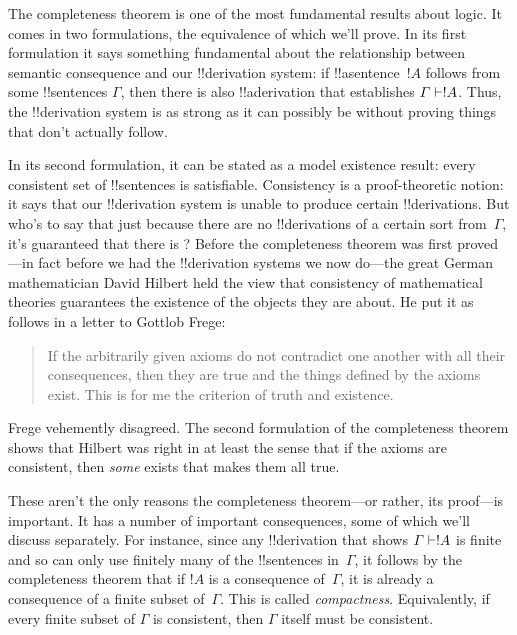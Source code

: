 \documentclass[../../../include/open-logic-section]{subfiles}
\begin{document}
      {}
      {}


The completeness theorem is one of the most fundamental results about
logic.  It comes in two formulations, the equivalence of which we'll
prove.  In its first formulation it says something fundamental about
the relationship between semantic consequence and our !!{derivation}
system: if !!a{sentence}~$!A$ follows from some !!{sentence}s
$\Gamma$, then there is also !!a{derivation} that establishes $\Gamma
\Proves !A$. Thus, the !!{derivation} system is as strong as it can
possibly be without proving things that don't actually follow.

In its second formulation, it can be stated as a model existence
result: every consistent set of !!{sentence}s is satisfiable.
Consistency is a proof-theoretic notion: it says that our
!!{derivation} system is unable to produce certain !!{derivation}s.
But who's to say that just because there are no !!{derivation}s of a
certain sort from~$\Gamma$, it's guaranteed that there is
? Before the
completeness theorem was first proved---in fact before we had the
!!{derivation} systems we now do---the great German mathematician
David Hilbert held the view that consistency of mathematical theories
guarantees the existence of the objects they are about. He put it as
follows in a letter to Gottlob Frege:
\begin{quote}
  If the arbitrarily given axioms do not contradict one another with
  all their consequences, then they are true and the things defined by
  the axioms exist. This is for me the criterion of truth and
  existence. 
\end{quote}
Frege vehemently disagreed. The second formulation of the completeness
theorem shows that Hilbert was right in at least the sense that if the
axioms are consistent, then \emph{some}
 exists that makes them all
true.

These aren't the only reasons the completeness theorem---or rather,
its proof---is important.  It has a number of important consequences,
some of which we'll discuss separately.  For instance, since any
!!{derivation} that shows $\Gamma \Proves !A$ is finite and so can
only use finitely many of the !!{sentence}s in~$\Gamma$, it follows by
the completeness theorem that if $!A$ is a consequence of~$\Gamma$, it
is already a consequence of a finite subset of~$\Gamma$.  This is
called \emph{compactness}.  Equivalently, if every finite subset of
$\Gamma$ is consistent, then $\Gamma$ itself must be consistent.
\end{document}
